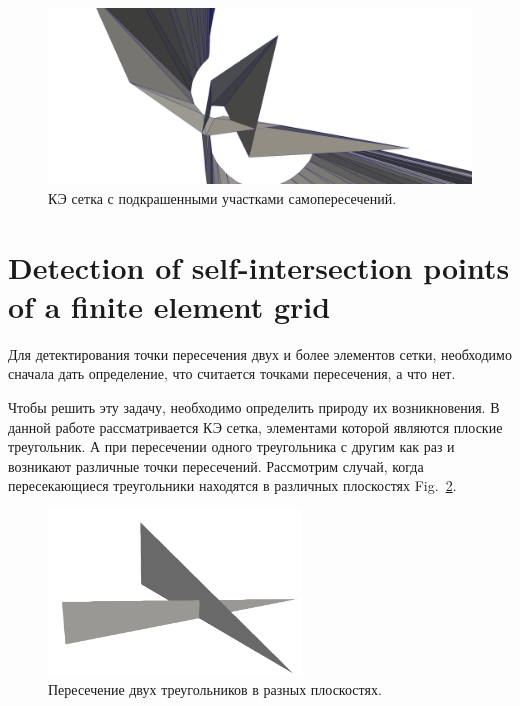 \documentclass[
11pt,%
tightenlines,%
twoside,%
onecolumn,%
nofloats,%
nobibnotes,%
nofootinbib,%
superscriptaddress,%
noshowpacs,%
centertags]%
{revtex4}
\begin{document}
\begin{figure}[h]
\includegraphics[width=1.0\textwidth]{pics/pic_1.png}
\caption{КЭ сетка с подкрашенными участками самопересечений.}\label{fig:1}
\end{figure}

\section{Detection of self-intersection points of a finite element grid}

Для детектирования точки пересечения двух и более элементов сетки, необходимо сначала дать определение, что считается точками пересечения, а что нет.

Чтобы решить эту задачу, необходимо определить природу их возникновения.
В данной работе рассматривается КЭ сетка, элементами которой являются плоские треугольник. А при пересечении одного треугольника с другим как раз и возникают различные точки пересечений.
Рассмотрим случай, когда пересекающиеся треугольники находятся в различных плоскостях Fig.~\ref{fig:2}. 

\begin{figure}[h]
\includegraphics[width=0.6\textwidth]{pics/pic_2.png}
\caption{Пересечение двух треугольников в разных плоскостях.}\label{fig:2}
\end{figure}
\end{document}
